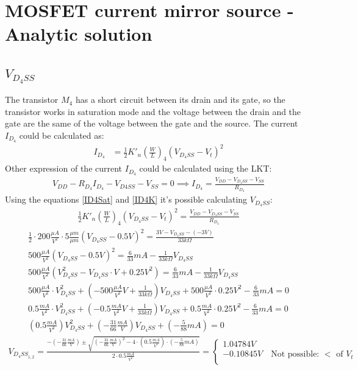 \documentclass[10pt,a4paper]{book}
\begin{document}
\section{MOSFET current mirror source - Analytic solution}
\subsection{$V_{D_4SS}$}
The transistor $M_4$ has a short circuit between its drain and its gate, so the transistor works in saturation mode and the voltage between the drain and the gate are the same of the voltage between the gate and the source.
The current $I_{D_4}$ could be calculated as:\\
\begin{align}
I_{D_4} &= \frac{1}{2}{K'}_n \left(\frac{W}{L}\right)_4 (V_{D_4SS} - V_t)^2 \label{ID4Sat}
\end{align}
Other expression of the current $I_{D_4}$ could be calculated using the LKT:\\
\begin{align}
V_{DD}-R_{D_4}I_{D_4}-V_{D4SS}-V_{SS} = 0 \implies
I_{D_4} = \frac{V_{DD} - V_{D_4SS} - V_{SS}}{R_{D_4}}\label{ID4K}
\end{align}
Using the equations \ref{ID4Sat} and \ref{ID4K} it's possible calculating $V_{D_4SS}$:\\
\begin{align}
\frac{1}{2}{K'}_n \left(\frac{W}{L}\right)_4 (V_{D_4SS} - V_t)^2 = \frac{V_{DD} - V_{D_4SS} - V_{SS}}{R_{D_4}}
\end{align}
\begin{align}
\frac{1}{2}\cdot 200 \frac{\mu A}{V^2} \cdot 5 \frac{\mu m}{\mu m} (V_{D_4SS} - 0.5V)^2 = \frac{3V - V_{D_4SS} - (-3V)}{33k\Omega}\\
500 \frac{\mu A}{V^2} (V_{D_4SS} -0.5V)^2 = \frac{6}{33}mA-\frac{1}{33k\Omega}V_{D_4SS}\\
500 \frac{\mu A}{V^2} (V_{D_4SS}^2- V_{D_4SS}\cdot V +0.25V^2) = \frac{6}{33}mA-\frac{1}{33k\Omega}V_{D_4SS}\\
500 \frac{\mu A}{V^2} \cdot V_{D_4SS}^2 + \left(-500 \frac{\mu A}{V^2}V + \frac{1}{33k\Omega}\right) V_{D_4SS} + 500 \frac{\mu A}{V^2} \cdot 0.25V^2 -\frac{6}{33}mA = 0\\
0.5 \frac{mA}{V^2} \cdot V_{D_4SS}^2 + \left(-0.5 \frac{mA}{V^2}V + \frac{1}{33k\Omega}\right) V_{D_4SS} + 0.5 \frac{mA}{V^2} \cdot 0.25V^2 -\frac{6}{33}mA = 0\\
\left(0.5 \frac{mA}{V^2}\right) V_{D_4SS}^2 + \left( -\frac{31}{66}\frac{mA}{V}\right) V_{D_4SS} + \left(-\frac{5}{88}mA\right) = 0
\end{align}
\begin{align}
V_{{D_{4}SS}_{1,2}} = \frac{-\left( -\frac{31}{66}\frac{mA}{V}\right)\pm \sqrt{\left(-\frac{31}{66}\frac{mA}{V}\right)^2-4\cdot\left(0.5 \frac{mA}{V^2}\right)\cdot\left(-\frac{5}{88}mA\right)}}{2\cdot0.5 \frac{mA}{V^2}} = 
\left\{
\begin{array}{l}
1.04784V \label{VD4SS}\\
-0.10845V \quad \text{Not possible: }<\text{ of } V_t\\
\end{array}
\right. 
\end{align}
\end{document}
